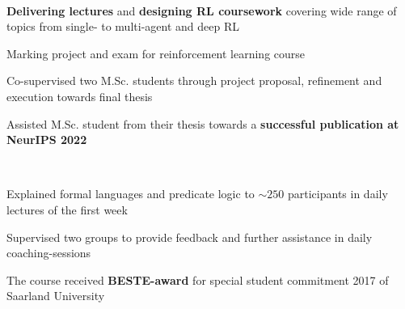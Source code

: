 \documentclass[]{lukas-cv-openfont}
\begin{document}

\noindent
{}
\\
\begin{tightitemize}{1.7em}
    \item \textbf{Delivering lectures} and \textbf{designing RL coursework} covering wide range of topics from single- to multi-agent and deep RL
    \item Marking project and exam for reinforcement learning course
\end{tightitemize}
\largesectionsep

\begin{tightitemize}{1.7em}
    \item Co-supervised two M.Sc. students through project proposal, refinement and execution towards final thesis
    \item Assisted M.Sc. student from their thesis towards a \textbf{successful publication at NeurIPS 2022}
\end{tightitemize}
\largesectionsep

\noindent
{}
\\
\begin{tightitemize}{1.7em}
    \item Explained formal languages and predicate logic to $\sim250$ participants in daily lectures of the first week
    \item Supervised two groups to provide feedback and further assistance in daily coaching-sessions
    \item The course received \textbf{BESTE-award} for special student commitment 2017 of Saarland University
\end{tightitemize}
\largesectionsep
\end{document}
